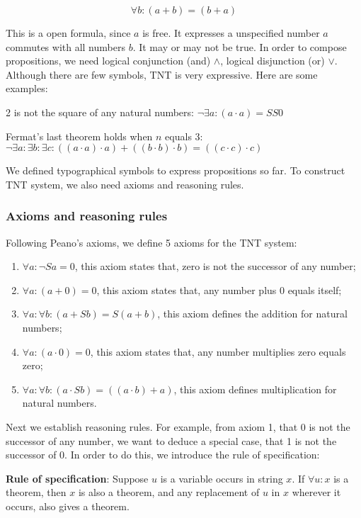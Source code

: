 \documentclass[b5paper]{article}
\begin{document}
\[
\forall b : (a + b) = (b + a)
\]

This is a open formula, since $a$ is free. It expresses a unspecified number $a$ commutes with all numbers $b$. It may or may not be true. In order to compose propositions, we need logical conjunction (and) $\land$, logical disjunction (or) $\lor$. Although there are few symbols, TNT is very expressive. Here are some examples:

2 is not the square of any natural numbers: $\lnot \exists a : (a \cdot a) = SS0$

Fermat's last theorem holds when $n$ equals 3: $\lnot \exists a : \exists b : \exists c : ((a \cdot a) \cdot a) + ((b \cdot b) \cdot b) = ((c \cdot c) \cdot c)$

We defined typographical symbols to express propositions so far. To construct TNT system, we also need axioms and reasoning rules.

\subsubsection{Axioms and reasoning rules}

Following Peano's axioms, we define 5 axioms for the TNT system:

\begin{enumerate}
\item $\forall a : \lnot Sa = 0$, this axiom states that, zero is not the successor of any number;
\item $\forall a: (a + 0) = 0$, this axiom states that, any number plus 0 equals itself;
\item $\forall a: \forall b: (a + Sb) = S(a + b)$, this axiom defines the addition for natural numbers;
\item $\forall a: (a \cdot 0) = 0$, this axiom states that, any number multiplies zero equals zero;
\item $\forall a: \forall b: (a \cdot Sb) = ((a \cdot b) + a)$, this axiom defines multiplication for natural numbers.
\end{enumerate}

Next we establish reasoning rules. For example, from axiom 1, that 0 is not the successor of any number, we want to deduce a special case, that 1 is not the successor of 0. In order to do this, we introduce the rule of specification:

\textbf{Rule of specification}: Suppose $u$ is a variable occurs in string $x$. If $\forall u: x$ is a theorem, then $x$ is also a theorem, and any replacement of $u$ in $x$ wherever it occurs, also gives a theorem.
\end{document}
